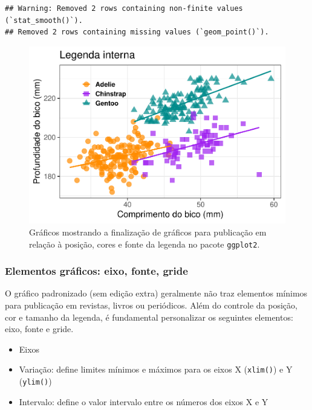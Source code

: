 \documentclass[
]{article}
\providecommand{\tightlist}{%
  \setlength{\itemsep}{0pt}\setlength{\parskip}{0pt}}
\begin{document}
\begin{verbatim}
## Warning: Removed 2 rows containing non-finite values (`stat_smooth()`).
## Removed 2 rows containing missing values (`geom_point()`).
\end{verbatim}

\begin{figure}
\centering
\includegraphics{epr_files/figure-latex/fig-plot-final-legenda-5.pdf}
\caption{\label{fig:fig-plot-final-legenda-5}Gráficos mostrando a finalização de gráficos para publicação em relação à posição, cores e fonte da legenda no pacote \texttt{ggplot2}.}
\end{figure}

\hypertarget{elementos-gruxe1ficos-eixo-fonte-gride}{%
\subsubsection{Elementos gráficos: eixo, fonte, gride}\label{elementos-gruxe1ficos-eixo-fonte-gride}}

O gráfico padronizado (sem edição extra) geralmente não traz elementos mínimos para publicação em revistas, livros ou periódicos. Além do controle da posição, cor e tamanho da legenda, é fundamental personalizar os seguintes elementos: eixo, fonte e gride.

\begin{itemize}
\tightlist
\item
  Eixos
\item
  Variação: define limites mínimos e máximos para os eixos X (\texttt{xlim()}) e Y (\texttt{ylim()})
\item
  Intervalo: define o valor intervalo entre os números dos eixos X e Y
\end{itemize}
\end{document}
